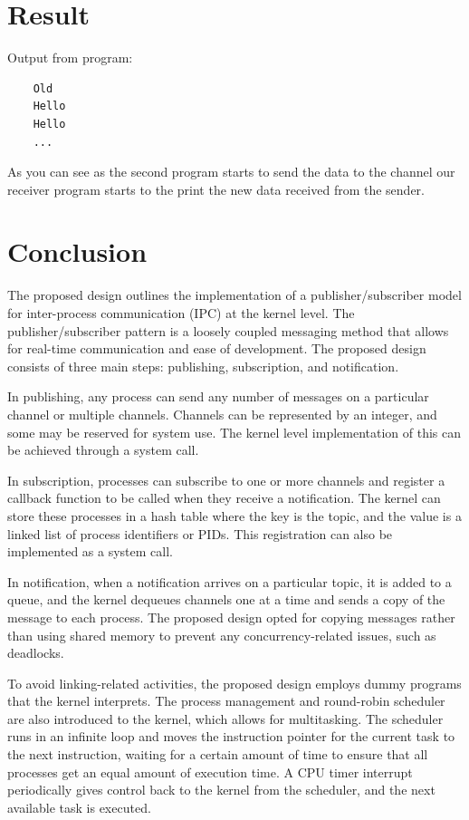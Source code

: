 \documentclass[12pt]{report}
\begin{document}
    \chapter{Result}
    Output from program:
    \begin{verbatim}
    Old
    Hello
    Hello
    ...
    \end{verbatim}
    
    As you can see as the second program starts to send the data to the channel our receiver program starts to the print the new data received from the sender.

    \chapter{Conclusion}
    The proposed design outlines the implementation of a publisher/subscriber model for inter-process communication (IPC) at the kernel level. The publisher/subscriber pattern is 
    a loosely coupled messaging method that allows for real-time communication and ease of development. The proposed design consists of three main steps: publishing, subscription, and 
    notification.

    In publishing, any process can send any number of messages on a particular channel or multiple channels. Channels can be represented by an integer, and some may be reserved 
    for system use. The kernel level implementation of this can be achieved through a system call.

    In subscription, processes can subscribe to one or more channels and register a callback function to be called when they receive a notification. The kernel can 
    store these processes in a hash table where the key is the topic, and the value is a linked list of process identifiers or PIDs. This registration can also be 
    implemented as a system call.

    In notification, when a notification arrives on a particular topic, it is added to a queue, and the kernel dequeues channels one at a time and sends a 
    copy of the message to each process. The proposed design opted for copying messages rather than using shared memory to prevent any concurrency-related issues, 
    such as deadlocks.

    To avoid linking-related activities, the proposed design employs dummy programs that the kernel interprets. The process management and round-robin scheduler are 
    also introduced to the kernel, which allows for multitasking. The scheduler runs in an infinite loop and moves the instruction pointer for the current task to the 
    next instruction, waiting for a certain amount of time to ensure that all processes get an equal amount of execution time. A CPU timer interrupt periodically gives 
    control back to the kernel from the scheduler, and the next available task is executed.
\end{document}
